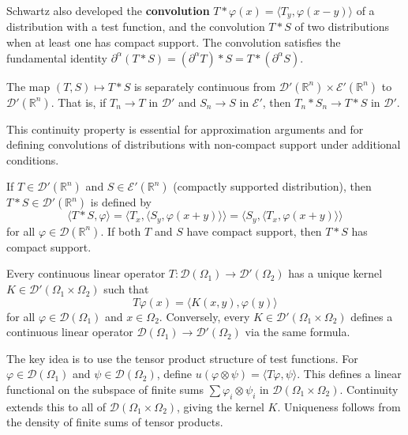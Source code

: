 Schwartz also developed the \textbf{convolution} $T * \varphi(x) = \langle T_y, \varphi(x-y) \rangle$ of a distribution with a test function, and the convolution $T * S$ of two distributions when at least one has compact support. The convolution satisfies the fundamental identity $\partial^\alpha(T * S) = (\partial^\alpha T) * S = T * (\partial^\alpha S)$.

\begin{theorem}
The map $(T, S) \mapsto T * S$ is separately continuous from $\mathcal{D}'(\mathbb{R}^n) \times \mathcal{E}'(\mathbb{R}^n)$ to $\mathcal{D}'(\mathbb{R}^n)$. That is, if $T_n \to T$ in $\mathcal{D}'$ and $S_n \to S$ in $\mathcal{E}'$, then $T_n * S_n \to T * S$ in $\mathcal{D}'$.
\end{theorem}

This continuity property is essential for approximation arguments and for defining convolutions of distributions with non-compact support under additional conditions.

\begin{theorem}\label{thm:convolution}
If $T \in \mathcal{D}'(\mathbb{R}^n)$ and $S \in \mathcal{E}'(\mathbb{R}^n)$ (compactly supported distribution), then $T * S \in \mathcal{D}'(\mathbb{R}^n)$ is defined by
\[\langle T * S, \varphi \rangle = \langle T_x, \langle S_y, \varphi(x+y) \rangle \rangle = \langle S_y, \langle T_x, \varphi(x+y) \rangle \rangle\]
for all $\varphi \in \mathcal{D}(\mathbb{R}^n)$. If both $T$ and $S$ have compact support, then $T * S$ has compact support.
\end{theorem}

\begin{theorem}\label{thm:kernel}
Every continuous linear operator $T: \mathcal{D}(\Omega_1) \to \mathcal{D}'(\Omega_2)$ has a unique kernel $K \in \mathcal{D}'(\Omega_1 \times \Omega_2)$ such that
\[T\varphi(x) = \langle K(x,y), \varphi(y) \rangle\]
for all $\varphi \in \mathcal{D}(\Omega_1)$ and $x \in \Omega_2$. Conversely, every $K \in \mathcal{D}'(\Omega_1 \times \Omega_2)$ defines a continuous linear operator $\mathcal{D}(\Omega_1) \to \mathcal{D}'(\Omega_2)$ via the same formula.
\end{theorem}

\begin{remark}
The key idea is to use the tensor product structure of test functions. For $\varphi \in \mathcal{D}(\Omega_1)$ and $\psi \in \mathcal{D}(\Omega_2)$, define $u(\varphi \otimes \psi) = \langle T\varphi, \psi \rangle$. This defines a linear functional on the subspace of finite sums $\sum \varphi_i \otimes \psi_i$ in $\mathcal{D}(\Omega_1 \times \Omega_2)$. Continuity extends this to all of $\mathcal{D}(\Omega_1 \times \Omega_2)$, giving the kernel $K$. Uniqueness follows from the density of finite sums of tensor products.
\end{remark}

